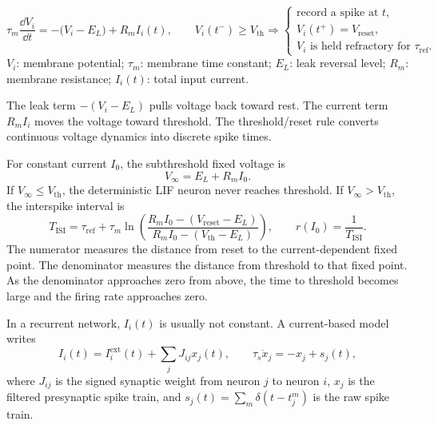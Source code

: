 \begin{keyequation}
\begin{equation}
  \tau_m\frac{\dd V_i}{\dd t}
  =
  -\bigl(V_i-E_L\bigr)
  +
  R_m I_i(t),
  \qquad
  V_i(t^-)\geq V_{\mathrm{th}}
  \Rightarrow
  \begin{cases}
    \text{record a spike at }t,\\
    V_i(t^+)=V_{\mathrm{reset}},\\
    V_i\text{ is held refractory for }\tau_{\mathrm{ref}} .
  \end{cases}
  \label{eq:project-lif}
\end{equation}
\tcblower
$V_i$: membrane potential; $\tau_m$: membrane time constant; $E_L$: leak reversal level; $R_m$: membrane resistance; $I_i(t)$: total input current.
\end{keyequation}

\noindent The leak term $-(V_i-E_L)$ pulls voltage back toward rest. The current term $R_m I_i$ moves the voltage toward threshold. The threshold/reset rule converts continuous voltage dynamics into discrete spike times.

For constant current $I_0$, the subthreshold fixed voltage is
%
\begin{equation}
  V_\infty=E_L+R_m I_0 .
  \label{eq:lif-v-infty-project}
\end{equation}
%
If $V_\infty\leq V_{\mathrm{th}}$, the deterministic LIF neuron never reaches threshold. If $V_\infty>V_{\mathrm{th}}$, the interspike interval is
%
\begin{equation}
  T_{\mathrm{ISI}}
  =
  \tau_{\mathrm{ref}}
  +
  \tau_m
  \ln\!\left(
    \frac{R_m I_0-(V_{\mathrm{reset}}-E_L)}
         {R_m I_0-(V_{\mathrm{th}}-E_L)}
  \right),
  \qquad
  r(I_0)=\frac{1}{T_{\mathrm{ISI}}}.
  \label{eq:lif-rate-project}
\end{equation}
%
The numerator measures the distance from reset to the current-dependent fixed point. The denominator measures the distance from threshold to that fixed point. As the denominator approaches zero from above, the time to threshold becomes large and the firing rate approaches zero.

In a recurrent network, $I_i(t)$ is usually not constant. A current-based model writes
%
\begin{equation}
  I_i(t)
  =
  I_i^{\mathrm{ext}}(t)
  +
  \sum_j J_{ij}x_j(t),
  \qquad
  \tau_s\dot x_j=-x_j+s_j(t),
  \label{eq:lif-network-current-input}
\end{equation}
%
where $J_{ij}$ is the signed synaptic weight from neuron $j$ to neuron $i$, $x_j$ is the filtered presynaptic spike train, and $s_j(t)=\sum_m\delta(t-t_j^m)$ is the raw spike train.

